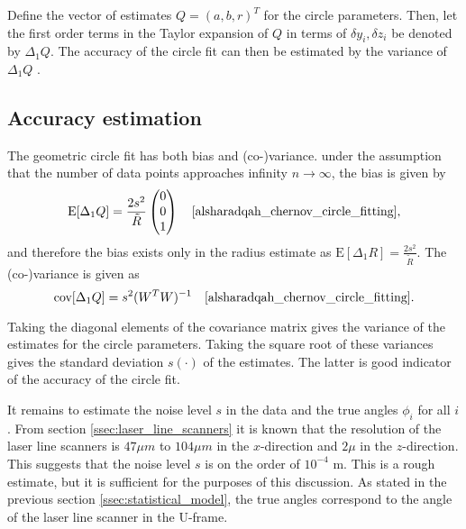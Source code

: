 Define the vector of estimates $Q = (a, b, r)^T$ for the circle parameters. Then, let the first order terms in the Taylor expansion of $Q$ in terms of $\delta y_i, \delta z_i$ be denoted by $\Delta_1Q$. The accuracy of the circle fit can then be estimated by the variance of $\Delta_1Q$ \cite[section 2]{alsharadqah_chernov_circle_fitting}.

\subsection{Accuracy estimation}
The geometric circle fit has both bias and (co-)variance. under the assumption that the number of data points approaches infinity $n \rightarrow \infty$, the bias is given by
\begin{equation}
    \text{E}[\Delta_1 Q] = \frac{2s^2}{\tilde{R}} \begin{pmatrix} 0 \\ 0 \\ 1 \end{pmatrix} \quad \text{\cite[equation 6.14]{alsharadqah_chernov_circle_fitting}},
    \label{eq:circle_fit_bias}
\end{equation}
and therefore the bias exists only in the radius estimate as $\text{E}[\Delta_1 R] =\frac{2s^2}{\tilde{R}}$. The (co-)variance is given as
\begin{equation}
    \text{cov}[\Delta_1 Q] = s^2 (W^T W)^{-1} \quad \text{\cite[equation 8.12]{alsharadqah_chernov_circle_fitting}}.
    \label{eq:circle_fit_variance}
\end{equation}

Taking the diagonal elements of the covariance matrix gives the variance of the estimates for the circle parameters. Taking the square root of these variances gives the standard deviation $s(\cdot)$ of the estimates. The latter is good indicator of the accuracy of the circle fit.

It remains to estimate the noise level $s$ in the data and the true angles $\phi_i$ for all $i$. From section \ref{ssec:laser_line_scanners} it is known that the resolution of the laser line scanners is $47 \mu m$ to $104 \mu m$ in the $x$-direction and $2 \mu$ in the $z$-direction. This suggests that the noise level $s$ is on the order of $10^{-4}$ m. This is a rough estimate, but it is sufficient for the purposes of this discussion. As stated in the previous section \ref{ssec:statistical_model}, the true angles correspond to the angle of the laser line scanner in the U-frame.

